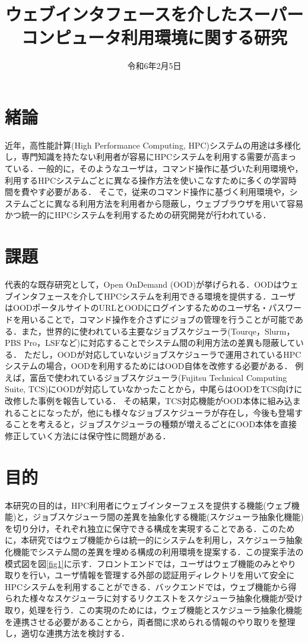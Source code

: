 \documentclass[a4paper,oneside,twocolumn,notitlepage,dvipdfmx]{jsarticle}
\date{令和6年2月5日}
\title{ウェブインタフェースを介したスーパーコンピュータ利用環境に関する研究}
\begin{document}
\maketitle
\section{緒論}
近年，高性能計算(High Performance Computing, HPC)システムの用途は多様化し，専門知識を持たない利用者が容易にHPCシステムを利用する需要が高まっている．一般的に，そのようなユーザは，コマンド操作に基づいた利用環境や，利用するHPCシステムごとに異なる操作方法を使いこなすために多くの学習時間を費やす必要がある．
そこで，従来のコマンド操作に基づく利用環境や，システムごとに異なる利用方法を利用者から隠蔽し，ウェブブラウザを用いて容易かつ統一的にHPCシステムを利用するための研究開発が行われている．\par

\vspace{3\baselineskip}
\section{課題}
代表的な既存研究として，Open OnDemand (OOD)が挙げられる\cite{citation_2}\cite{citation_3}．OODはウェブインタフェースを介してHPCシステムを利用できる環境を提供する．ユーザはOODポータルサイトのURLとOODにログインするためのユーザ名・パスワードを用いることで，コマンド操作を介さずにジョブの管理を行うことが可能である．また，世界的に使われている主要なジョブスケジューラ(Tourqe，Slurm，PBS Pro，LSFなど)に対応することでシステム間の利用方法の差異も隠蔽している．
ただし，OODが対応していないジョブスケジューラで運用されているHPCシステムの場合，OODを利用するためにはOOD自体を改修する必要がある．
例えば，富岳で使われているジョブスケジューラ(Fujitsu Technical Computing Suite, TCS)にOODが対応していなかったことから，中尾らはOODをTCS向けに改修した事例を報告している\cite{citation_1}．
その結果，TCS対応機能がOOD本体に組み込まれることになったが，他にも様々なジョブスケジューラが存在し，今後も登場することを考えると，ジョブスケジューラの種類が増えるごとにOOD本体を直接修正していく方法には保守性に問題がある．\par

\vspace{3\baselineskip}
\section{目的}
本研究の目的は，HPC利用者にウェブインターフェスを提供する機能(ウェブ機能)と，ジョブスケジューラ間の差異を抽象化する機能(スケジューラ抽象化機能)を切り分け，それぞれ独立に保守できる構成を実現することである．このために，本研究ではウェブ機能からは統一的にシステムを利用し，スケジューラ抽象化機能でシステム間の差異を埋める構成の利用環境を提案する．この提案手法の模式図を図\ref{fig1}に示す．フロントエンドでは，ユーザはウェブ機能のみとやり取りを行い，ユーザ情報を管理する外部の認証用ディレクトリを用いて安全にHPCシステムを利用することができる．バックエンドでは，ウェブ機能から得られた様々なスケジューラに対するリクエストをスケジューラ抽象化機能が受け取り，処理を行う．この実現のためには，ウェブ機能とスケジューラ抽象化機能を連携させる必要があることから，両者間に求められる情報のやり取りを整理し，適切な連携方法を検討する．\par
\end{document}
